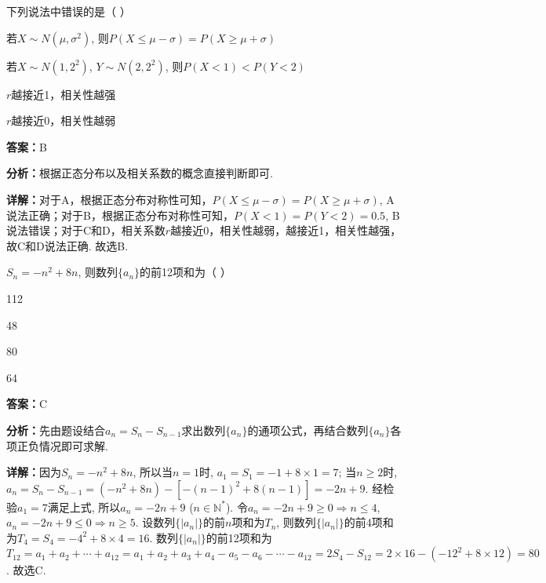 \begin{question}[points=5]
下列说法中错误的是（   ）
\begin{choices}
  \item 若$X \sim N(\mu, \sigma^2)$, 则$P(X \le \mu - \sigma) = P(X \ge \mu + \sigma)$
  \item 若$X \sim N(1, 2^2)$, $Y \sim N(2, 2^2)$, 则$P(X < 1) < P(Y < 2)$
  \item $r$越接近1，相关性越强
  \item $r$越接近0，相关性越弱
\end{choices}
\begin{solution}
\textbf{答案：}B

\textbf{分析：}根据正态分布以及相关系数的概念直接判断即可.

\textbf{详解：}对于A，根据正态分布对称性可知，$P(X \le \mu - \sigma) = P(X \ge \mu + \sigma)$, A说法正确；对于B，根据正态分布对称性可知，$P(X < 1) = P(Y < 2) = 0.5$, B说法错误；对于C和D，相关系数$r$越接近0，相关性越弱，越接近1，相关性越强，故C和D说法正确. 故选B.
\end{solution}
\end{question}

\begin{question}[points=5]
$S_n = -n^2 + 8n$, 则数列$\{a_n\}$的前12项和为（   ）
\begin{choices}
  \item 112
  \item 48
  \item 80
  \item 64
\end{choices}
\begin{solution}
\textbf{答案：}C

\textbf{分析：}先由题设结合$a_n = S_n - S_{n-1}$求出数列$\{a_n\}$的通项公式，再结合数列$\{a_n\}$各项正负情况即可求解.

\textbf{详解：}因为$S_n = -n^2 + 8n$, 所以当$n=1$时, $a_1 = S_1 = -1 + 8 \times 1 = 7$; 当$n \ge 2$时, $a_n = S_n - S_{n-1} = (-n^2 + 8n) - [-(n-1)^2 + 8(n-1)] = -2n + 9$. 经检验$a_1 = 7$满足上式, 所以$a_n = -2n + 9$ ($n \in \mathbb{N}^*$). 令$a_n = -2n + 9 \ge 0 \Rightarrow n \le 4$, $a_n = -2n + 9 \le 0 \Rightarrow n \ge 5$. 设数列$\{|a_n|\}$的前$n$项和为$T_n$, 则数列$\{|a_n|\}$的前4项和为$T_4 = S_4 = -4^2 + 8 \times 4 = 16$. 数列$\{|a_n|\}$的前12项和为$T_{12} = a_1 + a_2 + \cdots + a_{12} = a_1 + a_2 + a_3 + a_4 - a_5 - a_6 - \cdots - a_{12} = 2S_4 - S_{12} = 2 \times 16 - (-12^2 + 8 \times 12) = 80$. 故选C.
\end{solution}
\end{question}

